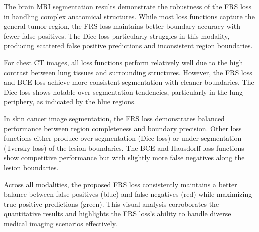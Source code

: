 \documentclass[review]{elsarticle}
\begin{document}
The brain MRI segmentation results demonstrate the robustness of the FRS loss in handling complex anatomical structures. While most loss functions capture the general tumor region, the FRS loss maintains better boundary accuracy with fewer false positives. The Dice loss particularly struggles in this modality, producing scattered false positive predictions and inconsistent region boundaries.

For chest CT images, all loss functions perform relatively well due to the high contrast between lung tissues and surrounding structures. However, the FRS loss and BCE loss achieve more consistent segmentation with cleaner boundaries. The Dice loss shows notable over-segmentation tendencies, particularly in the lung periphery, as indicated by the blue regions.

In skin cancer image segmentation, the FRS loss demonstrates balanced performance between region completeness and boundary precision. Other loss functions either produce over-segmentation (Dice loss) or under-segmentation (Tversky loss) of the lesion boundaries. The BCE and Hausdorff loss functions show competitive performance but with slightly more false negatives along the lesion boundaries.

Across all modalities, the proposed FRS loss consistently maintains a better balance between false positives (blue) and false negatives (red) while maximizing true positive predictions (green). This visual analysis corroborates the quantitative results and highlights the FRS loss's ability to handle diverse medical imaging scenarios effectively.
\end{document}
